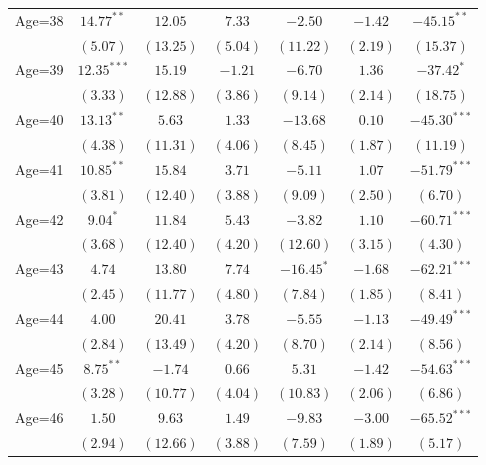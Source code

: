 \documentclass[fullpage]{paper}
\begin{document}
\begin{center}
\begin{longtable}{l c c c c c c }
Age=38      & $14.77^{**}$  & $12.05$      & $7.33$       & $-2.50$       & $-1.42$       & $-45.15^{**}$  \\
            & $(5.07)$      & $(13.25)$    & $(5.04)$     & $(11.22)$     & $(2.19)$      & $(15.37)$      \\
Age=39      & $12.35^{***}$ & $15.19$      & $-1.21$      & $-6.70$       & $1.36$        & $-37.42^{*}$   \\
            & $(3.33)$      & $(12.88)$    & $(3.86)$     & $(9.14)$      & $(2.14)$      & $(18.75)$      \\
Age=40      & $13.13^{**}$  & $5.63$       & $1.33$       & $-13.68$      & $0.10$        & $-45.30^{***}$ \\
            & $(4.38)$      & $(11.31)$    & $(4.06)$     & $(8.45)$      & $(1.87)$      & $(11.19)$      \\
Age=41      & $10.85^{**}$  & $15.84$      & $3.71$       & $-5.11$       & $1.07$        & $-51.79^{***}$ \\
            & $(3.81)$      & $(12.40)$    & $(3.88)$     & $(9.09)$      & $(2.50)$      & $(6.70)$       \\
Age=42      & $9.04^{*}$    & $11.84$      & $5.43$       & $-3.82$       & $1.10$        & $-60.71^{***}$ \\
            & $(3.68)$      & $(12.40)$    & $(4.20)$     & $(12.60)$     & $(3.15)$      & $(4.30)$       \\
Age=43      & $4.74$        & $13.80$      & $7.74$       & $-16.45^{*}$  & $-1.68$       & $-62.21^{***}$ \\
            & $(2.45)$      & $(11.77)$    & $(4.80)$     & $(7.84)$      & $(1.85)$      & $(8.41)$       \\
Age=44      & $4.00$        & $20.41$      & $3.78$       & $-5.55$       & $-1.13$       & $-49.49^{***}$ \\
            & $(2.84)$      & $(13.49)$    & $(4.20)$     & $(8.70)$      & $(2.14)$      & $(8.56)$       \\
Age=45      & $8.75^{**}$   & $-1.74$      & $0.66$       & $5.31$        & $-1.42$       & $-54.63^{***}$ \\
            & $(3.28)$      & $(10.77)$    & $(4.04)$     & $(10.83)$     & $(2.06)$      & $(6.86)$       \\
Age=46      & $1.50$        & $9.63$       & $1.49$       & $-9.83$       & $-3.00$       & $-65.52^{***}$ \\
            & $(2.94)$      & $(12.66)$    & $(3.88)$     & $(7.59)$      & $(1.89)$      & $(5.17)$       \\

\end{longtable}
\end{center}
\end{document}
